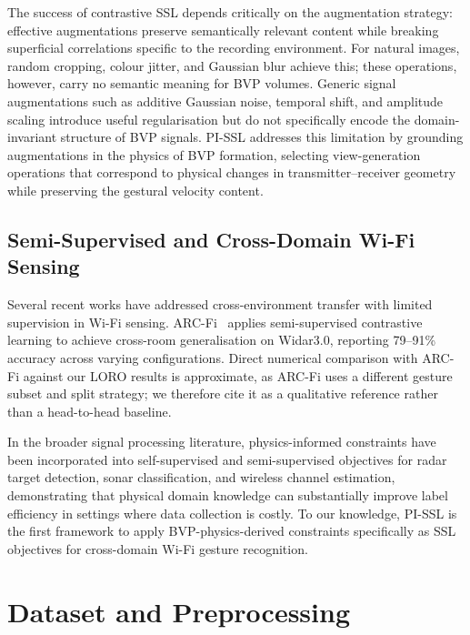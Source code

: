 \documentclass[journal]{IEEEtran}
\begin{document}
The success of contrastive SSL depends critically on the augmentation
strategy: effective augmentations preserve semantically relevant
content while breaking superficial correlations specific to the
recording environment.
For natural images, random cropping, colour jitter, and Gaussian blur
achieve this; these operations, however, carry no semantic meaning
for BVP volumes.
Generic signal augmentations such as additive Gaussian noise, temporal
shift, and amplitude scaling introduce useful regularisation but do
not specifically encode the domain-invariant structure of BVP signals.
PI-SSL addresses this limitation by grounding augmentations in the
physics of BVP formation, selecting view-generation operations that
correspond to physical changes in transmitter--receiver geometry
while preserving the gestural velocity content.

\subsection{Semi-Supervised and Cross-Domain Wi-Fi Sensing}
\label{sec:related:semi}

Several recent works have addressed cross-environment transfer with
limited supervision in Wi-Fi sensing.
ARC-Fi~\cite{yang2023arcfi} applies semi-supervised contrastive
learning to achieve cross-room generalisation on Widar3.0,
reporting 79--91\% accuracy across varying configurations.
Direct numerical comparison with ARC-Fi against our LORO results is
approximate, as ARC-Fi uses a different gesture subset and split
strategy; we therefore cite it as a qualitative reference rather
than a head-to-head baseline.

In the broader signal processing literature, physics-informed
constraints have been incorporated into self-supervised and
semi-supervised objectives for radar target detection, sonar
classification, and wireless channel estimation, demonstrating that
physical domain knowledge can substantially improve label efficiency
in settings where data collection is costly.
To our knowledge, PI-SSL is the first framework to apply
BVP-physics-derived constraints specifically as SSL objectives for
cross-domain Wi-Fi gesture recognition.

\section{Dataset and Preprocessing}
\label{sec:dataset}
\end{document}
